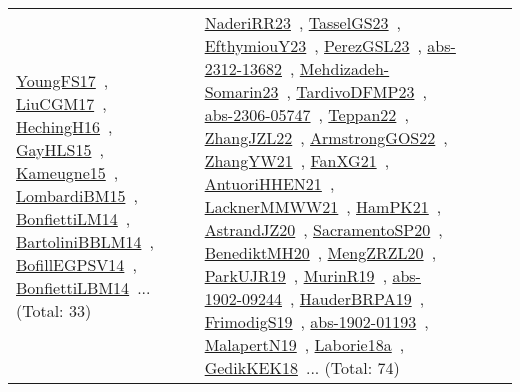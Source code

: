 {\begin{longtable}{lp{3cm}>{\raggedright\arraybackslash}p{6cm}>{\raggedright\arraybackslash}p{6cm}>{\raggedright\arraybackslash}p{8cm}}
\href{papers/YoungFS17.pdf}{YoungFS17}~\cite{YoungFS17}, \href{papers/LiuCGM17.pdf}{LiuCGM17}~\cite{LiuCGM17}, \href{papers/HechingH16.pdf}{HechingH16}~\cite{HechingH16}, \href{papers/GayHLS15.pdf}{GayHLS15}~\cite{GayHLS15}, \href{articles/Kameugne15.pdf}{Kameugne15}~\cite{Kameugne15}, \href{papers/LombardiBM15.pdf}{LombardiBM15}~\cite{LombardiBM15}, \href{papers/BonfiettiLM14.pdf}{BonfiettiLM14}~\cite{BonfiettiLM14}, \href{papers/BartoliniBBLM14.pdf}{BartoliniBBLM14}~\cite{BartoliniBBLM14}, \href{papers/BofillEGPSV14.pdf}{BofillEGPSV14}~\cite{BofillEGPSV14}, \href{articles/BonfiettiLBM14.pdf}{BonfiettiLBM14}~\cite{BonfiettiLBM14}... (Total: 33) & \href{articles/NaderiRR23.pdf}{NaderiRR23}~\cite{NaderiRR23}, \href{papers/TasselGS23.pdf}{TasselGS23}~\cite{TasselGS23}, \href{papers/EfthymiouY23.pdf}{EfthymiouY23}~\cite{EfthymiouY23}, \href{papers/PerezGSL23.pdf}{PerezGSL23}~\cite{PerezGSL23}, \href{articles/abs-2312-13682.pdf}{abs-2312-13682}~\cite{abs-2312-13682}, \href{papers/Mehdizadeh-Somarin23.pdf}{Mehdizadeh-Somarin23}~\cite{Mehdizadeh-Somarin23}, \href{papers/TardivoDFMP23.pdf}{TardivoDFMP23}~\cite{TardivoDFMP23}, \href{articles/abs-2306-05747.pdf}{abs-2306-05747}~\cite{abs-2306-05747}, \href{papers/Teppan22.pdf}{Teppan22}~\cite{Teppan22}, \href{papers/ZhangJZL22.pdf}{ZhangJZL22}~\cite{ZhangJZL22}, \href{papers/ArmstrongGOS22.pdf}{ArmstrongGOS22}~\cite{ArmstrongGOS22}, \href{articles/ZhangYW21.pdf}{ZhangYW21}~\cite{ZhangYW21}, \href{articles/FanXG21.pdf}{FanXG21}~\cite{FanXG21}, \href{papers/AntuoriHHEN21.pdf}{AntuoriHHEN21}~\cite{AntuoriHHEN21}, \href{papers/LacknerMMWW21.pdf}{LacknerMMWW21}~\cite{LacknerMMWW21}, \href{articles/HamPK21.pdf}{HamPK21}~\cite{HamPK21}, \href{articles/AstrandJZ20.pdf}{AstrandJZ20}~\cite{AstrandJZ20}, \href{articles/SacramentoSP20.pdf}{SacramentoSP20}~\cite{SacramentoSP20}, \href{articles/BenediktMH20.pdf}{BenediktMH20}~\cite{BenediktMH20}, \href{articles/MengZRZL20.pdf}{MengZRZL20}~\cite{MengZRZL20}, \href{papers/ParkUJR19.pdf}{ParkUJR19}~\cite{ParkUJR19}, \href{papers/MurinR19.pdf}{MurinR19}~\cite{MurinR19}, \href{articles/abs-1902-09244.pdf}{abs-1902-09244}~\cite{abs-1902-09244}, \href{articles/HauderBRPA19.pdf}{HauderBRPA19}~\cite{HauderBRPA19}, \href{papers/FrimodigS19.pdf}{FrimodigS19}~\cite{FrimodigS19}, \href{articles/abs-1902-01193.pdf}{abs-1902-01193}~\cite{abs-1902-01193}, \href{papers/MalapertN19.pdf}{MalapertN19}~\cite{MalapertN19}, \href{papers/Laborie18a.pdf}{Laborie18a}~\cite{Laborie18a}, \href{articles/GedikKEK18.pdf}{GedikKEK18}~\cite{GedikKEK18}... (Total: 74)\\

\end{longtable}}
